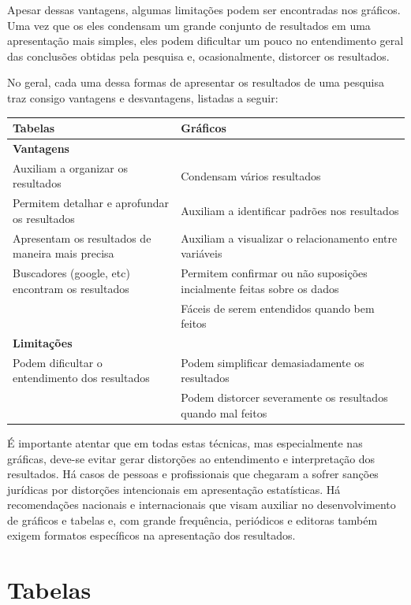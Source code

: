 \documentclass[
]{book}
\begin{document}
Apesar dessas vantagens, algumas limitações podem ser encontradas nos gráficos. Uma vez que os eles condensam um grande conjunto de resultados em uma apresentação mais simples, eles podem dificultar um pouco no entendimento geral das conclusões obtidas pela pesquisa e, ocasionalmente, distorcer os resultados.

No geral, cada uma dessa formas de apresentar os resultados de uma pesquisa traz consigo vantagens e desvantagens, listadas a seguir:

\begin{longtable}[]{@{}
  >{\raggedright\arraybackslash}p{}
  >{\raggedright\arraybackslash}p{}@{}}
\toprule
Tabelas & Gráficos \\
\midrule
\endhead
\textbf{Vantagens} & \\
Auxiliam a organizar os resultados & Condensam vários resultados \\
Permitem detalhar e aprofundar os resultados & Auxiliam a identificar padrões nos resultados \\
Apresentam os resultados de maneira mais precisa & Auxiliam a visualizar o relacionamento entre variáveis \\
Buscadores (google, etc) encontram os resultados & Permitem confirmar ou não suposições incialmente feitas sobre os dados \\
& Fáceis de serem entendidos quando bem feitos \\
\textbf{Limitações} & \\
Podem dificultar o entendimento dos resultados & Podem simplificar demasiadamente os resultados \\
& Podem distorcer severamente os resultados quando mal feitos \\
\bottomrule
\end{longtable}

É importante atentar que em todas estas técnicas, mas especialmente nas gráficas, deve-se evitar gerar distorções ao entendimento e interpretação dos resultados. Há casos de pessoas e profissionais que chegaram a sofrer sanções jurídicas por distorções intencionais em apresentação estatísticas. Há recomendações nacionais e internacionais que visam auxiliar no desenvolvimento de gráficos e tabelas e, com grande frequência, periódicos e editoras também exigem formatos específicos na apresentação dos resultados.

\hypertarget{tabelas}{%
\section{Tabelas}\label{tabelas}}
\end{document}
